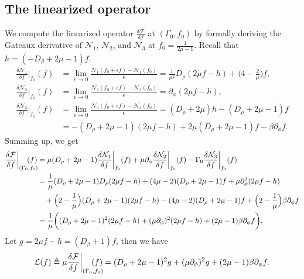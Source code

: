 \documentclass[11pt]{article}
\theoremstyle{definition}
\theoremstyle{remark}
\numberwithin{equation}{section}
\newcommand{\mcal}{\mathcal}
\newcommand{\del}{\partial}
\begin{document}
\subsection{The linearized operator} \label{subsec:2.3}
We compute the linearized operator $\frac{\delta \mcal{F}}{\delta f}$ at $(\Gamma_0, f_0)$ by formally deriving the Gateaux derivative of $\mcal{N}_1$, $\mcal{N}_2$, and $\mcal{N}_3$ at $f_0 = \frac{1}{2\mu - 1}$. Recall that $h = (-D_\beta + 2\mu - 1)f$.
\begin{align*}
    \frac{\delta \mcal{N}_1}{\delta f}\bigg\vert_{f_0}(f) &= \lim_{\epsilon \to 0} \frac{\mcal{N}_1(f_0 + \epsilon f) - \mcal{N}_1(f_0)}{\epsilon} = \frac{1}{\mu^2} D_\rho (2\mu f - h) + \Big(4 - \frac{2}{\mu} \Big)f, \\
    \frac{\delta \mcal{N}_2}{\delta f}\bigg\vert_{f_0}(f) &= \lim_{\epsilon \to 0} \frac{\mcal{N}_2(f_0 + \epsilon f) - \mcal{N}_2(f_0)}{\epsilon} = \del_\phi (2\mu f - h), \\
    \frac{\delta \mcal{N}_3}{\delta f}\bigg\vert_{f_0}(f) &= \lim_{\epsilon \to 0} \frac{\mcal{N}_3(f_0 + \epsilon f) - \mcal{N}_3(f_0)}{\epsilon} = (D_\rho + 2\mu) h - (D_\rho + 2\mu - 1)f\\ 
    &= -(D_\rho + 2\mu - 1)(2\mu f - h) + 2\mu (D_\rho + 2\mu - 1)f - \beta \del_\phi f.
\end{align*}
Summing up, we get
\begin{align*}
    \frac{\delta \mcal{F}}{\delta f}\bigg\vert_{(\Gamma_0, f_0)} \hspace{-1.5em} (f) &= \mu (D_\rho + 2\mu - 1) \frac{\delta \mcal{N}_1}{\delta f}\bigg\vert_{f_0}(f) + \mu \del_\phi \frac{\delta \mcal{N}_2}{\delta f}\bigg\vert_{f_0}(f) - \Gamma_0 \frac{\delta \mcal{N}_3}{\delta f}\bigg\vert_{f_0}(f) \\
    &= \frac{1}{\mu} (D_\rho + 2\mu - 1) D_\rho (2\mu f - h) + (4\mu - 2) (D_\rho + 2\mu - 1)f + \mu \del^2_\phi (2\mu f - h) \\ 
    & \quad + \Big(2 - \frac{1}{\mu}\Big) (D_\rho + 2\mu - 1)(2\mu f - h) - (4\mu - 2)(D_\rho + 2\mu - 1)f + \Big(2 - \frac{1}{\mu}\Big) \beta \del_\phi f \\
    &= \frac{1}{\mu} \bigg( (D_\rho + 2\mu - 1)^2 (2\mu f - h) + (\mu \del_\phi)^2 (2\mu f - h) + (2\mu - 1) \beta \del_\phi f \bigg).
\end{align*}
Let $g = 2\mu f - h = (D_\beta + 1)f$, then we have
\begin{equation} \label{eq:2.11}
\mcal{L}(f) \triangleq \mu \frac{\delta \mcal{F}}{\delta f} \bigg\vert_{(\Gamma_0, f_0)} \hspace{-1.5em} (f) = (D_\rho + 2\mu - 1)^2 g + (\mu \del_\phi)^2 g + (2\mu - 1) \beta \del_\phi f.
\end{equation}
\end{document}
